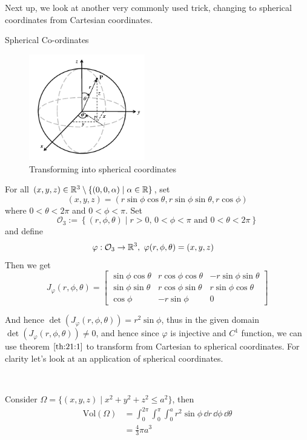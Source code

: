 \documentclass[../Analysis-3]{subfiles}
\begin{document}
Next up, we look at another very commonly used trick, changing to spherical coordinates from Cartesian coordinates.

\begin{Eg}{Spherical Co-ordinates}{}
    \begin{figure}
        \centering
        \includegraphics[width=0.45\textwidth]{../figures/lec21.2.png}
        \caption{Transforming into spherical coordinates}
        \label{fig2:21}
    \end{figure}
    For all $(x,y,z) \in \mathbb{R}^3 \setminus \{ (0,0,\alpha) \mid \alpha \in \mathbb{R} \}$, set
    \[
        (x,y,z) = (r\sin\phi\cos\theta, r\sin\phi\sin\theta, r \cos\phi)
    \]
    where $0 < \theta < 2\pi$ and $0 < \phi < \pi$. Set
    \[
        \mathcal{O}_3 := \left\{ (r,\phi,\theta) \mid r >0, \, 0 < \phi < \pi \mbox{ and } 0 < \theta < 2\pi \right\}
    \]
    and define
    \begin{align*}
        \varphi : \mathcal{O}_3 & \to \mathbb{R}^3, \ \varphi(r,\phi,\theta) = (x,y,z)
    \end{align*}
    Then we get
    \[
        J_{\varphi}(r,\phi,\theta) = \begin{bmatrix}
            \sin\phi\cos\theta & r\cos\phi\cos\theta & -r\sin\phi\sin\theta \\
            \sin\phi\sin\theta & r\cos\phi\sin\theta & r\sin\phi\cos\theta  \\
            \cos\phi           & -r\sin\phi          & 0
        \end{bmatrix}
    \]


    And hence $\det(J_{\varphi}(r,\phi,\theta)) = r^2 \sin \phi$, thus in the given domain $\det(J_{\varphi}(r,\phi,\theta)) \neq 0$, and hence since $\varphi$ is injective and $C^1$ function, we can use theorem $\ref{th:21:1}$ to transform from Cartesian to spherical coordinates. For clarity let's look at an application of spherical coordinates.

    \

    Consider $\Omega = \{ (x,y,z) \mid x^2 + y^2 + z^2 \leq a^2 \}$, then
    \begin{align*}
        \mathrm{Vol}(\Omega) & = \int_0^{2\pi}\int_0^{\pi} \int_0^a r^2 \sin \phi \, \dd r \, \dd \phi \, \dd \theta \\
                             & = \frac{4}{3}\pi a^3
    \end{align*}
\end{Eg}
\end{document}
